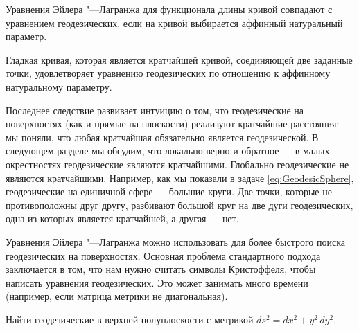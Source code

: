 \begin{theorem}
	Уравнения Эйлера "---Лагранжа для функционала длины кривой совпадают с уравнением геодезических, если на кривой выбирается аффинный натуральный параметр.
\end{theorem}

\begin{corollary}
	Гладкая кривая, которая является кратчайшей кривой, соединяющей две заданные точки, удовлетворяет уравнению геодезических по отношению к аффинному натуральному параметру.
\end{corollary}

Последнее следствие развивает интуицию о том, что геодезические на поверхностях (как и прямые на плоскости) реализуют кратчайшие расстояния: мы поняли, что любая кратчайшая обязательно является геодезической. В следующем разделе мы обсудим, что локально верно и обратное --- в малых окрестностях геодезические являются кратчайшими. Глобально геодезические не являются кратчайшими. Например, как мы показали в задаче \ref{eq:GeodesicSphere}, геодезические на единичной сфере --- большие круги. Две точки, которые не противоположны друг другу, разбивают большой круг на две дуги геодезических, одна из которых является кратчайшей, а другая --- нет.

Уравнения Эйлера "---Лагранжа можно использовать для более быстрого поиска геодезических на поверхностях. Основная проблема стандартного подхода заключается в том, что нам нужно считать символы Кристоффеля, чтобы написать уравнения геодезических. Это может занимать много времени (например, если матрица метрики не диагональная).

\begin{problem}
	Найти геодезические в верхней полуплоскости с метрикой $ds^2 = dx^2 + y^2\,dy^2$.
\end{problem}

